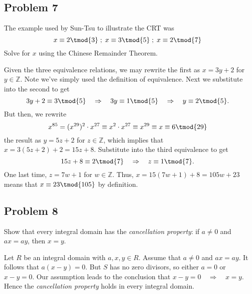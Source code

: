 \documentclass[../hw_sols.tex]{subfiles}
\begin{document}
\newpage



\subsection*{Problem 7}

The example used by Sun-Tsu to illustrate the CRT was
	$$x \equiv 2 \tmod{3} \; 
	; \; x \equiv 3 \tmod{5} \; 
	; \; x \equiv 2 \tmod{7}$$
Solve for $x$ using the Chinese Remainder Theorem.

\begin{solution}

Given the three equivalence relations, we may rewrite the first as $x = 3y + 2$ 
for $y \in \mathbb{Z}$. Note we've simply used the definition of equivalence. 
Next we substitute into the second to get 
	$$3y + 2 \equiv 3 \tmod{5} \quad 
	\Rightarrow \quad 3y \equiv 1 \tmod{5} \quad 
	\Rightarrow \quad y \equiv 2 \tmod{5}.$$
But then, we rewrite 
	$$x^{85} = (x^{29})^2 \cdot x^{27} \equiv x^2 \cdot x^{27} 
	\equiv x^{29} \equiv x \equiv 6 \tmod{29}$$
the result as $y = 5z + 2$ for $z \in \mathbb{Z}$, which implies that 
$x = 3(5z + 2) + 2 = 15z + 8$. Substitute into the third equivalence to get 
	$$15z + 8 \equiv 2 \tmod{7} 
	\quad \Rightarrow \quad 
	z \equiv 1 \tmod{7}.$$ 
One last time, $z = 7w + 1$ for $w \in \mathbb{Z}$. Thus, 
$x = 15(7w + 1) + 8 = 105w + 23$ means that $x \equiv 23 \tmod{105}$ by 
definition.

\end{solution}


\newpage



\subsection*{Problem 8}

Show that every integral domain has the \textit{cancellation property}: if 
$a \neq 0$ and $ax = ay$, then $x = y$.

\begin{solution}
Let $R$ be an integral domain with $a,x,y \in R$. Assume that $a \neq 0$ and 
$ax = ay$. It follows that $a(x - y) = 0$. But $S$ has no zero divisors, so 
either $a = 0$ or $x - y = 0$. Our assumption leads to the conclusion that 
$x - y = 0 \quad \Rightarrow \quad x = y$. Hence the 
\textit{cancellation property} holds in every integral domain.
\end{solution}
\end{document}
